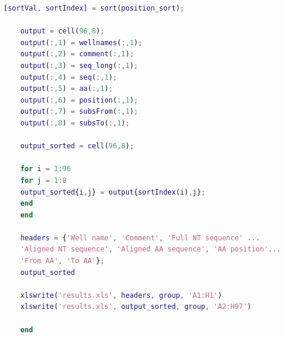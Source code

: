 \documentclass{article}
\begin{document}
\begin{lstlisting}[language=Matlab]
	[sortVal, sortIndex] = sort(position_sort);
	
	output = cell(96,8);
	output(:,1) = wellnames(:,1);
	output(:,2) = comment(:,1);
	output(:,3) = seq_long(:,1);
	output(:,4) = seq(:,1);
	output(:,5) = aa(:,1);
	output(:,6) = position(:,1);
	output(:,7) = subsFrom(:,1);
	output(:,8) = subsTo(:,1);
	
	output_sorted = cell(96,8);
	
	for i = 1:96
	for j = 1:8
	output_sorted{i,j} = output{sortIndex(i),j};
	end    
	end
	
	headers = {'Well name', 'Comment', 'Full NT sequence' ...
	'Aligned NT sequence', 'Aligned AA sequence', 'AA position'...
	'From AA', 'To AA'};
	output_sorted
	
	xlswrite('results.xls', headers, group, 'A1:H1')
	xlswrite('results.xls', output_sorted, group, 'A2:H97')
	
	end
	\end{lstlisting}
	\newpage
\end{document}
